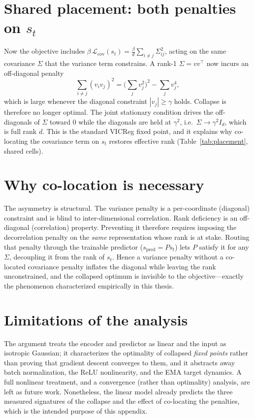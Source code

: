 \section{Shared placement: both penalties on $s_t$}
Now the objective includes $\beta\,\mathcal{L}_{\text{cov}}(s_t)
= \tfrac{\beta}{d}\sum_{i\neq j}\Sigma_{ij}^{2}$, acting on the same covariance
$\Sigma$ that the variance term constrains. A rank-1 $\Sigma = v v^{\top}$ now
incurs an off-diagonal penalty
\begin{equation}
    \sum_{i \neq j} (v_i v_j)^{2}
    = \Big(\sum_j v_j^{2}\Big)^{2} - \sum_j v_j^{4},
\end{equation}
which is large whenever the diagonal constraint $|v_j| \ge \gamma$ holds.
Collapse is therefore no longer optimal. The joint stationary condition drives
the off-diagonals of $\Sigma$ toward $0$ while the diagonals are held at
$\gamma^{2}$, i.e.\ $\Sigma \to \gamma^{2} I_d$, which is full rank $d$. This
is the standard VICReg fixed point, and it explains why co-locating the
covariance term on $s_t$ restores effective rank (Table~\ref{tab:placement},
shared cells).

\section{Why co-location is necessary}
The asymmetry is structural. The variance penalty is a per-coordinate
(diagonal) constraint and is blind to inter-dimensional correlation. Rank
deficiency is an off-diagonal (correlation) property. Preventing it therefore
requires imposing the decorrelation penalty on the \emph{same} representation
whose rank is at stake. Routing that penalty through the trainable predictor
($s_{\text{pred}} = P s_t$) lets $P$ satisfy it for any $\Sigma$, decoupling it
from the rank of $s_t$. Hence a variance penalty without a co-located
covariance penalty inflates the diagonal while leaving the rank unconstrained,
and the collapsed optimum is invisible to the objective---exactly the
phenomenon characterized empirically in this thesis.

\section{Limitations of the analysis}
\label{app:theory-limits}
The argument treats the encoder and predictor as linear and the input as
isotropic Gaussian; it characterizes the optimality of collapsed
\emph{fixed points} rather than proving that gradient descent converges to
them, and it abstracts away batch normalization, the ReLU nonlinearity, and the
EMA target dynamics. A full nonlinear treatment, and a convergence (rather than
optimality) analysis, are left as future work. Nonetheless, the linear model
already predicts the three measured signatures of the collapse and the
effect of co-locating the penalties, which is the intended purpose of this
appendix.
